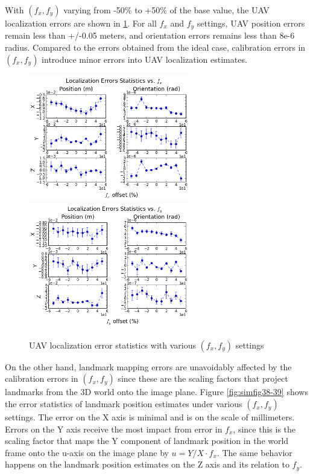 With $(f_x, f_y)$ varying from -50\% to +50\% of the base value, the
UAV localization errors are shown in \ref{fig:simfig43-44}. For all
$f_x$ and $f_y$ settings, UAV position errors remain less than
+/-0.05 meters, and orientation errors remains less than 8e-6 radius.
Compared to the errors obtained from the ideal case, calibration
errors in $(f_x, f_y)$ introduce minor errors into UAV localization
estimates.
\begin{figure}[h]
  \centering
  \includegraphics[width=7cm,keepaspectratio=true]{./Figures/SimulationFigures/Figure43.png}
  \includegraphics[width=7cm,keepaspectratio=true]{./Figures/SimulationFigures/Figure44.png}
  \caption{UAV localization error statistics with various $(f_x, f_y)$
  settings}
  \label{fig:simfig43-44}
\end{figure}

On the other hand, landmark mapping errors are unavoidably affected by
the calibration errors in $(f_x, f_y)$ since these are the scaling
factors that project landmarks from the 3D world onto the image plane.
Figure \ref{fig:simfig38-39} shows the error statistics of landmark
position estimates under various $(f_x, f_y)$ settings. The error on
the X axis is minimal and is on the scale of millimeters. Errors on
the Y axis receive the most impact from error in $f_x$, since this is
the scaling factor that maps the Y component of landmark position in
the world frame onto the u-axis on the image plane by $u = Y/X \cdot
f_x$. The same behavior happens on the landmark position estimates on
the Z axis and its relation to $f_y$.

